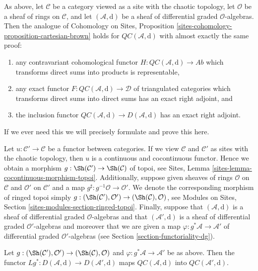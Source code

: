 \begin{remark}
\label{remark-cartesian-brown}
As above, let $\mathcal{C}$ be a category viewed as a site with
the chaotic topology, let $\mathcal{O}$ be a sheaf of rings on $\mathcal{C}$,
and let $(\mathcal{A}, \text{d})$ be a sheaf of differential graded
$\mathcal{O}$-algebras. Then the analogue of
Cohomology on Sites, Proposition
\ref{sites-cohomology-proposition-cartesian-brown}
holds for $\mathit{QC}(\mathcal{A}, \text{d})$ with almost
exactly the same proof:
\begin{enumerate}
\item any contravariant cohomological functor
$H : \mathit{QC}(\mathcal{A}, \text{d}) \to \textit{Ab}$
which transforms direct sums into products is representable,
\item any exact functor
$F : \mathit{QC}(\mathcal{A}, \text{d}) \to \mathcal{D}$
of triangulated categories which transforms direct sums into direct sums
has an exact right adjoint, and
\item the inclusion functor
$\mathit{QC}(\mathcal{A}, \text{d}) \to D(\mathcal{A}, \text{d})$ has
an exact right adjoint.
\end{enumerate}
If we ever need this we will precisely formulate and prove this here.
\end{remark}

\noindent
Let $u : \mathcal{C}' \to \mathcal{C}$ be a functor between categories.
If we view $\mathcal{C}$ and $\mathcal{C}'$ as sites with the chaotic
topology, then $u$ is a continuous and cocontinuous functor. Hence
we obtain a morphism $g : \Sh(\mathcal{C}') \to \Sh(\mathcal{C})$
of topoi, see Sites, Lemma \ref{sites-lemma-cocontinuous-morphism-topoi}.
Additionally, suppose given sheaves of rings $\mathcal{O}$ on $\mathcal{C}$
and $\mathcal{O}'$ on $\mathcal{C}'$ and a map
$g^\sharp : g^{-1}\mathcal{O} \to \mathcal{O}'$.
We denote the corresponding morphism of ringed topoi simply
$g : (\Sh(\mathcal{C}'), \mathcal{O}') \to (\Sh(\mathcal{C}), \mathcal{O})$,
see Modules on Sites, Section \ref{sites-modules-section-ringed-topoi}.
Finally, suppose that $(\mathcal{A}, \text{d})$ is a sheaf of differential
graded $\mathcal{O}$-algebras and that 
$(\mathcal{A}', \text{d})$ is a sheaf of differential
graded $\mathcal{O}'$-algebras and moreover that we are given a map
$\varphi : g^*\mathcal{A} \to \mathcal{A}'$ of differential graded
$\mathcal{O}'$-algebras (see Section \ref{section-functoriality-dg}).

\begin{lemma}
\label{lemma-cartesian-functorial}
Let $g : (\Sh(\mathcal{C}'), \mathcal{O}') \to (\Sh(\mathcal{C}), \mathcal{O})$
and $\varphi : g^*\mathcal{A} \to \mathcal{A}'$
be as above. Then the functor
$Lg^* : D(\mathcal{A}, \text{d}) \to D(\mathcal{A}', \text{d})$
maps $\mathit{QC}(\mathcal{A}, \text{d})$ into
$\mathit{QC}(\mathcal{A}', \text{d})$.
\end{lemma}

